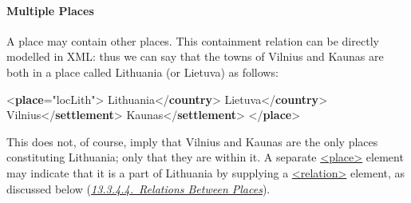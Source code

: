 \paragraph[{Multiple Places}]{Multiple Places}\label{NDGEOGmp}\par
A place may contain other places. This containment relation can be directly modelled in XML: thus we can say that the towns of Vilnius and Kaunas are both in a place called Lithuania (or Lietuva) as follows: \par\bgroup{}\exampleFont \begin{shaded}\noindent\mbox{}{<\textbf{place}\hspace*{1em}{xml:id}="{locLith}">}\mbox{}\newline 
{}Lithuania{</\textbf{country}>}\mbox{}\newline 
{}Lietuva{</\textbf{country}>}\mbox{}\newline 
{}\mbox{}\newline 
\hspace*{1em}Vilnius{</\textbf{settlement}>}\mbox{}\newline 
{}\mbox{}\newline 
{}\mbox{}\newline 
\hspace*{1em}Kaunas{</\textbf{settlement}>}\mbox{}\newline 
{}\mbox{}\newline 
{</\textbf{place}>}\end{shaded}\egroup\par \par
This does not, of course, imply that Vilnius and Kaunas are the only places constituting Lithuania; only that they are within it. A separate \hyperref[TEI.place]{<place>} element may indicate that it is a part of Lithuania by supplying a \hyperref[TEI.relation]{<relation>} element, as discussed below (\textit{\hyperref[place-rel]{13.3.4.4.\ Relations Between Places}}).\par

